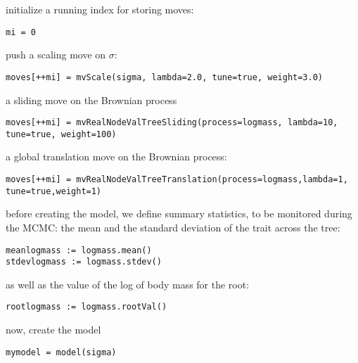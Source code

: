 initialize a running index for storing moves:
{\tt \small \begin{snugshade*}
\begin{lstlisting}
mi = 0
\end{lstlisting}
\end{snugshade*}}

push a scaling move on $\sigma$:
{\tt \small \begin{snugshade*}
\begin{lstlisting}
moves[++mi] = mvScale(sigma, lambda=2.0, tune=true, weight=3.0)
\end{lstlisting}
\end{snugshade*}}

a sliding move on the Brownian process
{\tt \small \begin{snugshade*}
\begin{lstlisting}
moves[++mi] = mvRealNodeValTreeSliding(process=logmass, lambda=10, tune=true, weight=100)
\end{lstlisting}
\end{snugshade*}}

a global translation move on the Brownian process:
{\tt \small \begin{snugshade*}
\begin{lstlisting}
moves[++mi] = mvRealNodeValTreeTranslation(process=logmass,lambda=1, tune=true,weight=1)
\end{lstlisting}
\end{snugshade*}}

before creating the model, we define summary statistics, to be monitored during the MCMC: the mean and the standard deviation of the trait across the tree:
{\tt \small \begin{snugshade*}
\begin{lstlisting}
meanlogmass := logmass.mean()
stdevlogmass := logmass.stdev()
\end{lstlisting}
\end{snugshade*}}

as well as the value of the log of body mass for the root:
{\tt \small \begin{snugshade*}
\begin{lstlisting}
rootlogmass := logmass.rootVal()
\end{lstlisting}
\end{snugshade*}}

now, create the model
{\tt \small \begin{snugshade*}
\begin{lstlisting}
mymodel = model(sigma)
\end{lstlisting}
\end{snugshade*}}

